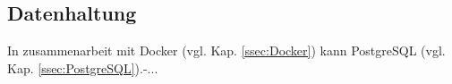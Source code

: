 \subsection{Datenhaltung}
\label{ssec:Datenhaltung}

In zusammenarbeit mit Docker (vgl. Kap. \vref{ssec:Docker}) kann PostgreSQL (vgl. Kap. \vref{ssec:PostgreSQL}).-...